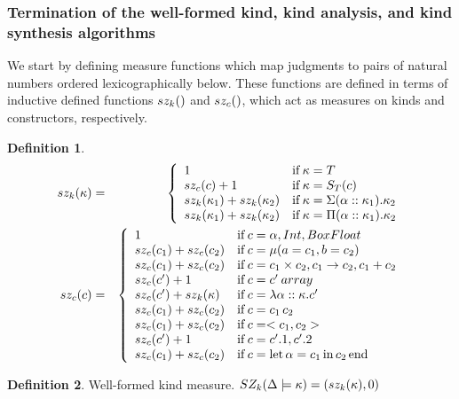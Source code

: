 \documentclass[12pt,twoside,fleqn]{amsart}
\theoremstyle{plain}
\theoremstyle{plain}
\theoremstyle{definition}
\newtheorem{defn}{Definition}
\begin{document}
\subsubsection{Termination of the well-formed kind, kind analysis, and kind synthesis algorithms}

We start by defining measure functions which map judgments to pairs of natural
numbers ordered lexicographically below. These functions are defined in terms
of inductive defined functions \( sz_k() \) and \( sz_{c}( ) \), which act as
measures on kinds and constructors, respectively.

\begin{defn}
\label{def:kindConMetrics}
\begin{eqnarray*}
sz_k(\kappa ) & = & \left\{ \begin{array}{ll}
1 & \mathrm{if}\, \kappa =T\\
sz_{c}(c )+1 & \mathrm{if}\, \kappa =S_{T}(c )\\
sz_k(\kappa _{1})+sz_k(\kappa _{2}) & \mathrm{if}\, \kappa =\Sigma (\alpha ::\kappa _{1}).\kappa _{2}\\
sz_k(\kappa _{1})+sz_k(\kappa _{2}) & \mathrm{if}\, \kappa =\Pi (\alpha ::\kappa _{1}).\kappa _{2}
\end{array}\right. \\
sz_{c}(c ) & = & \left\{ \begin{array}{ll}
1 & \mathrm{if}\, c=\alpha ,Int,BoxFloat\\
sz_{c}(c_{1} )+sz_{c}(c_{2} ) & \mathrm{if}\, c=\mu (a=c_{1},b=c_{2})\\
sz_{c}(c_{1} )+sz_{c}(c_{2} ) & \mathrm{if}\, c=c_{1}\times c_{2},c_{1}\rightarrow c_{2},c_{1}+c_{2}\\
sz_{c}(c' )+1 & \mathrm{if}\, c=c' \: array\\
sz_{c}(c' )+sz_k(\kappa ) & \mathrm{if}\, c=\lambda \alpha  ::\kappa  .c'\\
sz_{c}(c_{1} )+sz_{c}(c_{2} ) & \mathrm{if}\, c=c_{1}\, c_{2}\\
sz_{c}(c_{1} )+sz_{c}(c_{2} ) & \mathrm{if}\, c=<c_{1},c_{2}>\\
sz_{c}(c' )+1 & \mathrm{if}\, c=c'.1,c'.2\\
sz_{c}(c_{1} )+sz_{c}(c_{2} ) & \mathrm{if}\, c=\mathrm{let}\, \alpha  =c_{1} \, \mathrm{in}\, c_{2} \, \mathrm{end}
\end{array}\right. 
\end{eqnarray*}

\end{defn}
%

\begin{defn}
Well-formed kind measure. \( SZ_k(\Delta   \models \kappa  )=(sz_k(\kappa ),0) \)
\end{defn}
%
\end{document}
